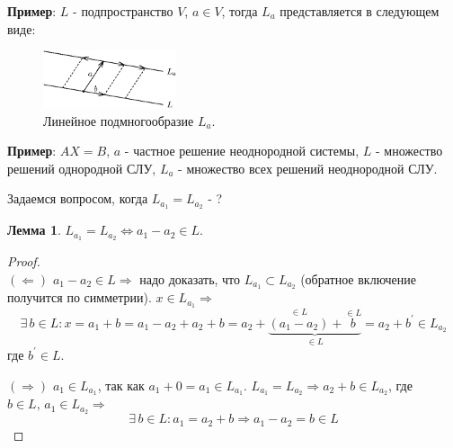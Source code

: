 \documentclass[12pt]{article}
\theoremstyle{definition}
\newtheorem{lemma}{Лемма}
\begin{document}
\textbf{Пример}: $L$ - подпространство $V$, $a \in V$, тогда $L_a$ представляется в следующем виде:
\begin{figure}[H]
	\centering
	\includegraphics[width=0.35\textwidth]{1_2.eps}
	\caption{Линейное подмногообразие $L_a$.}
	\label{1_2}
\end{figure}

\textbf{Пример}: $AX = B$, $a$ - частное решение неоднородной системы, $L$ - множество решений однородной СЛУ, $L_a$ - множество всех решений неоднородной СЛУ.

Задаемся вопросом, когда $L_{a_1} = L_{a_2}$ - ?
\begin{lemma}
	$L_{a_1} = L_{a_2} \Leftrightarrow a_1 - a_2 \in L$.
\end{lemma}
\begin{proof}\hfill\\
	$(\Leftarrow)$ $a_1 - a_2 \in L \Rightarrow$ надо доказать, что $L_{a_1} \subset L_{a_2}$ (обратное включение получится по симметрии). $x \in L_{a_1} \Rightarrow$ $$\exists \, b \in L \colon x = a_1 + b = a_1 - a_2 + a_2 + b = a_2 + \underbrace{\overset{\in L}{(a_1 - a_2)} + \overset{\in L}{b}}_{\in L} = a_2 + b^\prime \in L_{a_2}$$ 
	где $b^\prime \in L$.
	
	$(\Rightarrow)$ $a_1 \in L_{a_1}$, так как $a_1 + 0 = a_1 \in L_{a_1}$. $L_{a_1} = L_{a_2} \Rightarrow a_2 + b \in L_{a_2}$, где $b \in L, \, a_1 \in L_{a_2} \Rightarrow$
	$$\exists \, b \in L \colon a_1 = a_2 + b \Rightarrow a_1 - a_2 = b \in L$$
\end{proof}

\newpage
\end{document}
